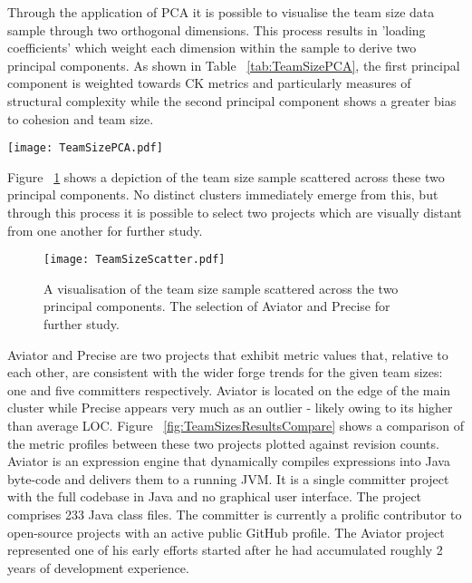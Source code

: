 Through the application of PCA it is possible to visualise the team size data sample through two orthogonal dimensions. This process results in 'loading coefficients' which weight each dimension within the sample to derive two principal components. As shown in Table ~\ref{tab:TeamSizePCA}, the first principal component is weighted towards CK metrics and particularly measures of structural complexity while the second principal component shows a greater bias to cohesion and team size.

\begin{table}
\begin{tabular}
 \centering 
 \texttt{[image: TeamSizePCA.pdf]}
 \label{tab:TeamSizePCA}
\end{tabular}
\end{table}

Figure ~\ref{fig:TeamSizeScatter} shows a depiction of the team size sample scattered across these two principal components. No distinct clusters immediately emerge from this, but through this process it is possible to select two projects which are visually distant from one another for further study.

\begin{figure}[htbp!] 
\centering    
\texttt{[image: TeamSizeScatter.pdf]}
\caption{A visualisation of the team size sample scattered across the two principal components. The selection of Aviator and Precise for further study.}
\label{fig:TeamSizeScatter}
\end{figure}

Aviator and Precise are two projects that exhibit metric values that, relative to each other, are consistent with the wider forge trends for the given team sizes: one and five committers respectively. Aviator is located on the edge of the main cluster while Precise appears very much as an outlier - likely owing to its higher than average LOC. Figure ~\ref{fig:TeamSizesResultsCompare} shows a comparison of the metric profiles between these two projects plotted against revision counts. Aviator is an expression engine that dynamically compiles expressions into Java byte-code and delivers them to a running JVM. It is a single committer project with the full codebase in Java and no graphical user interface. The project comprises 233 Java class files. The committer is currently a prolific contributor to open-source projects with an active public GitHub profile. The Aviator project represented one of his early efforts started after he had accumulated roughly 2 years of development experience. 

